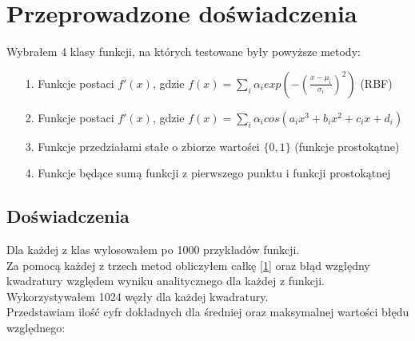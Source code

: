 \documentclass[11pt,wide]{mwart}
\begin{document}
\section{Przeprowadzone doświadczenia}
Wybrałem 4 klasy funkcji, na których testowane były powyższe metody:
\begin{enumerate}
    \item[1.] Funkcje postaci $f'(x)$, gdzie $f(x) = \sum_i \alpha_i exp(-(\frac{x-\mu_i}{\sigma_i})^2)$ (RBF)
    \item[2.] Funkcje postaci $f'(x)$, gdzie $f(x) = \sum_i \alpha_i cos(a_i x^3 + b_i x^2 + c_i x + d_i)$
    \item[3.] Funkcje przedziałami stałe o zbiorze wartości $\{0, 1\}$ (funkcje prostokątne)
    \item[4.] Funkcje będące sumą funkcji z pierwszego punktu i funkcji prostokątnej
\end{enumerate}
\subsection{Doświadczenia}
Dla każdej z klas wylosowałem po 1000 przykładów funkcji.\\
Za pomocą każdej z trzech metod obliczyłem całkę \eqref{1} oraz błąd względny kwadratury względem
wyniku analitycznego dla każdej z funkcji. Wykorzystywałem 1024 węzły dla każdej kwadratury.\\
Przedstawiam ilość cyfr dokładnych dla średniej oraz maksymalnej wartości błędu względnego:
\end{document}
